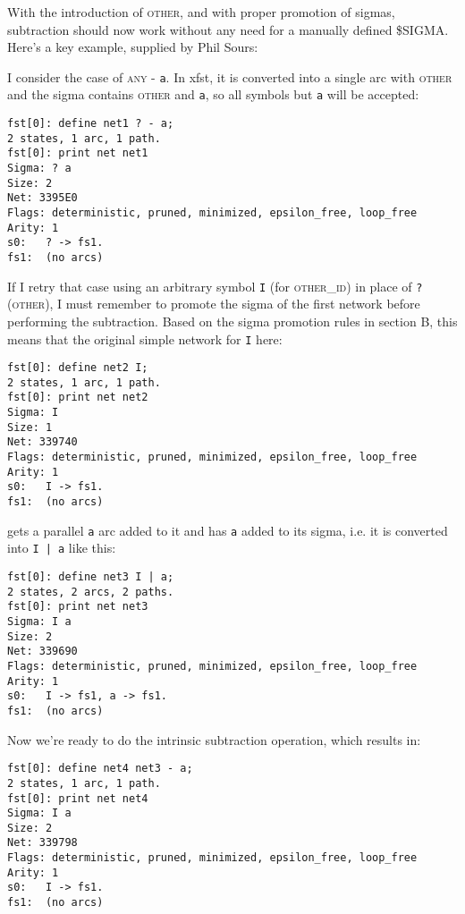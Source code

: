 \documentclass[letterpaper,11pt]{article}
\providecommand{\acro}{}\renewcommand{\acro}{\textsc}
\begin{document}
With the introduction of \acro{other}, and with proper promotion of sigmas, subtraction should now
work without any need for a manually defined \$SIGMA.  Here's a key example, supplied by
Phil Sours:

I consider the case of \acro{any} - \texttt{a}.  In xfst, it is converted into a
single arc with \acro{other}
and the sigma contains \acro{other} and \texttt{a}, so all symbols but \texttt{a} will be
accepted:

\begin{Verbatim}[fontsize=\footnotesize]
fst[0]: define net1 ? - a;
2 states, 1 arc, 1 path.
fst[0]: print net net1
Sigma: ? a
Size: 2
Net: 3395E0
Flags: deterministic, pruned, minimized, epsilon_free, loop_free
Arity: 1
s0:   ? -> fs1.
fs1:  (no arcs)
\end{Verbatim}

If I retry that case using an arbitrary symbol \texttt{I} (for \acro{other\_id}) in
place of \texttt{?}
(\acro{other}), I must remember to promote the sigma of the first network
before
performing the subtraction.  Based on the sigma promotion rules in
section B, this
means that the original simple network for \texttt{I} here:

\begin{Verbatim}[fontsize=\footnotesize]
fst[0]: define net2 I;
2 states, 1 arc, 1 path.
fst[0]: print net net2
Sigma: I
Size: 1
Net: 339740
Flags: deterministic, pruned, minimized, epsilon_free, loop_free
Arity: 1
s0:   I -> fs1.
fs1:  (no arcs)
\end{Verbatim}

\noindent
gets a parallel \texttt{a} arc added to it and has \texttt{a} added to its sigma, i.e.
it is converted into
\texttt{I~|~a} like this:

\begin{Verbatim}[fontsize=\footnotesize]
fst[0]: define net3 I | a;
2 states, 2 arcs, 2 paths.
fst[0]: print net net3
Sigma: I a
Size: 2
Net: 339690
Flags: deterministic, pruned, minimized, epsilon_free, loop_free
Arity: 1
s0:   I -> fs1, a -> fs1.
fs1:  (no arcs)
\end{Verbatim}

Now we're ready to do the intrinsic subtraction operation, which
results in:

\begin{Verbatim}[fontsize=\footnotesize]
fst[0]: define net4 net3 - a;
2 states, 1 arc, 1 path.
fst[0]: print net net4
Sigma: I a
Size: 2
Net: 339798
Flags: deterministic, pruned, minimized, epsilon_free, loop_free
Arity: 1
s0:   I -> fs1.
fs1:  (no arcs)
\end{Verbatim}
\end{document}
